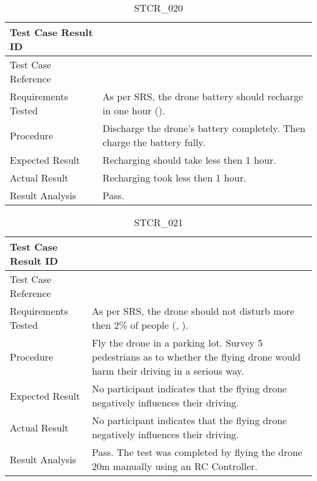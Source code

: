 \documentclass[12pt, titlepage]{article}
\begin{document}
\begin{table}[!h]
\begin{center}
\caption {STCR\_020}
\label{tab:STCR_020}
\begin{tabular}{ | m{3.2cm} | m{12.2cm} | } 
\hline
Test Case Result ID & \nameref{tab:STCR_020} \\ 
\hline
Test Case Reference & \nameref{tab:STC_020}  \\ 
\hline
Requirements Tested & As per SRS, the drone battery should recharge in one hour (\nameref{MTNC_001}). \\
\hline
Procedure & Discharge the drone's battery completely. Then charge the battery fully. \\
\hline
Expected Result & Recharging should take less then 1 hour.  \\ 
\hline
Actual Result &  Recharging took less then 1 hour.  \\
\hline
Result Analysis & Pass.  \\ 
\hline
\end{tabular}
\end{center}
\end{table}

\begin{table}[!h]
\begin{center}
\caption {STCR\_021}
\label{tab:STCR_021}
\begin{tabular}{ | m{3.2cm} | m{12.2cm} | } 
\hline
Test Case Result ID & \nameref{tab:STCR_021} \\ 
\hline
Test Case Reference & \nameref{tab:STC_021}  \\ 
\hline
Requirements Tested & As per SRS, the drone should not disturb more then 2\% of people (\nameref{SAFE_004}, \nameref{SAFE_001}).
 \\ 
\hline
Procedure & Fly the drone in a parking lot. Survey 5 pedestrians as to whether the flying drone would harm their driving in a serious way. \\
\hline
Expected Result & No participant indicates that the flying drone negatively influences their driving.  \\ 
\hline
Actual Result &  No participant indicates that the flying drone negatively influences their driving.  \\
\hline
Result Analysis & Pass. The test was completed by flying the drone 20m manually using an RC Controller. \\ 
\hline
\end{tabular}
\end{center}
\end{table}
\end{document}
